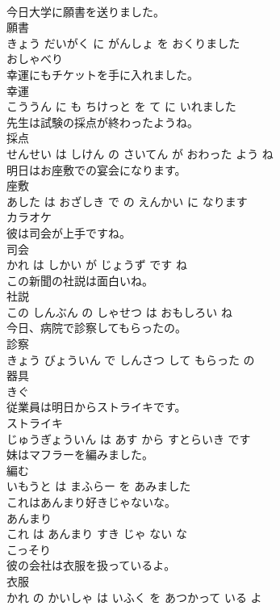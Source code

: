 \documentclass[8pt]{extreport}
\begin{document}
\begin{CJK}{UTF8}{min}
\\	今日大学に願書を送りました。	
\\	願書 
\\	きょう だいがく に がんしょ を おくりました			
\\	おしゃべり	
\\	幸運にもチケットを手に入れました。	
\\	幸運 
\\	こううん に も ちけっと を て に いれました			
\\	先生は試験の採点が終わったようね。	
\\	採点 
\\	せんせい は しけん の さいてん が おわった よう ね			
\\	明日はお座敷での宴会になります。	
\\	座敷 
\\	あした は おざしき で の えんかい に なります			
\\	カラオケ	
\\	彼は司会が上手ですね。	
\\	司会 
\\	かれ は しかい が じょうず です ね			
\\	この新聞の社説は面白いね。	
\\	社説 
\\	この しんぶん の しゃせつ は おもしろい ね			
\\	今日、病院で診察してもらったの。	
\\	診察 
\\	きょう びょういん で しんさつ して もらった の			
\\	器具	
\\	きぐ			
\\	従業員は明日からストライキです。	
\\	ストライキ 
\\	じゅうぎょういん は あす から すとらいき です			
\\	妹はマフラーを編みました。	
\\	編む 
\\	いもうと は まふらー を あみました			
\\	これはあんまり好きじゃないな。	
\\	あんまり 
\\	これ は あんまり すき じゃ ない な			
\\	こっそり	
\\	彼の会社は衣服を扱っているよ。	
\\	衣服 
\\	かれ の かいしゃ は いふく を あつかって いる よ			

\end{CJK}
\end{document}
